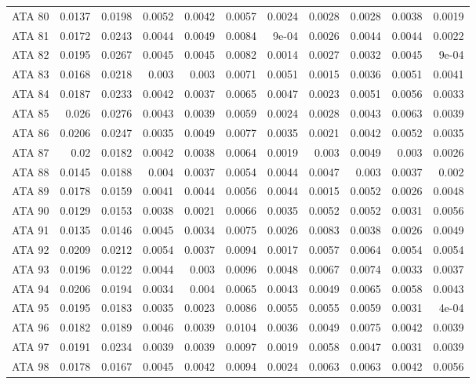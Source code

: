 \begin{landscape}
\begin{longtable}{rrrrrrrrrrr}
ATA 80 & 0.0137 & 0.0198 & 0.0052 & 0.0042 & 0.0057 & 0.0024 & 0.0028 & 0.0028 & 0.0038 & 0.0019 \\ 
  ATA 81 & 0.0172 & 0.0243 & 0.0044 & 0.0049 & 0.0084 & 9e-04 & 0.0026 & 0.0044 & 0.0044 & 0.0022 \\ 
  ATA 82 & 0.0195 & 0.0267 & 0.0045 & 0.0045 & 0.0082 & 0.0014 & 0.0027 & 0.0032 & 0.0045 & 9e-04 \\ 
  ATA 83 & 0.0168 & 0.0218 & 0.003 & 0.003 & 0.0071 & 0.0051 & 0.0015 & 0.0036 & 0.0051 & 0.0041 \\ 
  ATA 84 & 0.0187 & 0.0233 & 0.0042 & 0.0037 & 0.0065 & 0.0047 & 0.0023 & 0.0051 & 0.0056 & 0.0033 \\ 
  ATA 85 & 0.026 & 0.0276 & 0.0043 & 0.0039 & 0.0059 & 0.0024 & 0.0028 & 0.0043 & 0.0063 & 0.0039 \\ 
  ATA 86 & 0.0206 & 0.0247 & 0.0035 & 0.0049 & 0.0077 & 0.0035 & 0.0021 & 0.0042 & 0.0052 & 0.0035 \\ 
  ATA 87 & 0.02 & 0.0182 & 0.0042 & 0.0038 & 0.0064 & 0.0019 & 0.003 & 0.0049 & 0.003 & 0.0026 \\ 
  ATA 88 & 0.0145 & 0.0188 & 0.004 & 0.0037 & 0.0054 & 0.0044 & 0.0047 & 0.003 & 0.0037 & 0.002 \\ 
  ATA 89 & 0.0178 & 0.0159 & 0.0041 & 0.0044 & 0.0056 & 0.0044 & 0.0015 & 0.0052 & 0.0026 & 0.0048 \\ 
  ATA 90 & 0.0129 & 0.0153 & 0.0038 & 0.0021 & 0.0066 & 0.0035 & 0.0052 & 0.0052 & 0.0031 & 0.0056 \\ 
  ATA 91 & 0.0135 & 0.0146 & 0.0045 & 0.0034 & 0.0075 & 0.0026 & 0.0083 & 0.0038 & 0.0026 & 0.0049 \\ 
  ATA 92 & 0.0209 & 0.0212 & 0.0054 & 0.0037 & 0.0094 & 0.0017 & 0.0057 & 0.0064 & 0.0054 & 0.0054 \\ 
  ATA 93 & 0.0196 & 0.0122 & 0.0044 & 0.003 & 0.0096 & 0.0048 & 0.0067 & 0.0074 & 0.0033 & 0.0037 \\ 
  ATA 94 & 0.0206 & 0.0194 & 0.0034 & 0.004 & 0.0065 & 0.0043 & 0.0049 & 0.0065 & 0.0058 & 0.0043 \\ 
  ATA 95 & 0.0195 & 0.0183 & 0.0035 & 0.0023 & 0.0086 & 0.0055 & 0.0055 & 0.0059 & 0.0031 & 4e-04 \\ 
  ATA 96 & 0.0182 & 0.0189 & 0.0046 & 0.0039 & 0.0104 & 0.0036 & 0.0049 & 0.0075 & 0.0042 & 0.0039 \\ 
  ATA 97 & 0.0191 & 0.0234 & 0.0039 & 0.0039 & 0.0097 & 0.0019 & 0.0058 & 0.0047 & 0.0031 & 0.0039 \\ 
  ATA 98 & 0.0178 & 0.0167 & 0.0045 & 0.0042 & 0.0094 & 0.0024 & 0.0063 & 0.0063 & 0.0042 & 0.0056 \\ 

\end{longtable}
\end{landscape}
